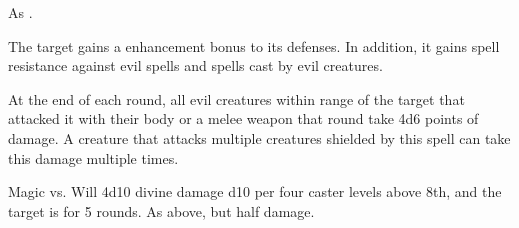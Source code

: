 \begin{spellheader}
\end{spellheader}
\begin{spelleffects}
    \spellsuccess As .
\end{spelleffects}
\begin{spellfooter}

\end{spellfooter}

\begin{spellheader}
    \spelldur{\durshort \dismissable}
\end{spellheader}
\begin{spelleffects}
    The target gains a  enhancement bonus to its defenses. In addition, it gains spell resistance against evil spells and spells cast by evil creatures.
    \par At the end of each round, all evil creatures within \rngclose range of the target that attacked it with their body or a melee weapon that round take 4d6 points of damage. A creature that attacks multiple creatures shielded by this spell can take this damage multiple times.
\end{spelleffects}
\begin{spellfooter}

\end{spellfooter}

\begin{spellheader}
    \spellrng{\rngmed}
\end{spellheader}
\begin{spelleffects}
    \begin{spellattack}{Magic vs. Will}
        \spellsuccess 4d10 divine damage \add d10 per four caster levels above 8th, and the target is \bewildered for 5 rounds.
        \spellfailure As above, but half damage.
    \end{spellattack}
\end{spelleffects}
\begin{spellfooter}

\end{spellfooter}

